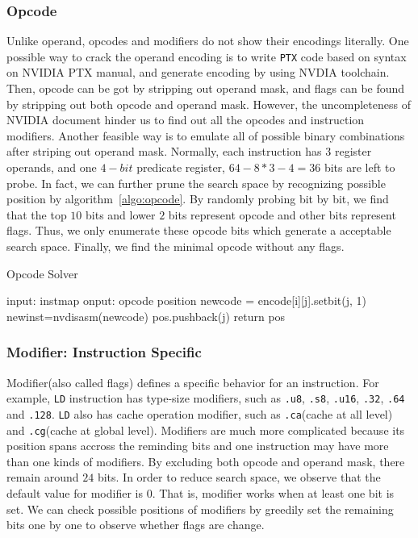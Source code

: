 \subsubsection{Opcode}
Unlike operand, opcodes and modifiers do not show their encodings literally. One possible way to crack the operand encoding is to write {\tt PTX} code
based on syntax on NVIDIA PTX manual, and generate encoding by using NVDIA toolchain.
Then, opcode can be got by stripping out operand mask, and flags can be found by stripping out both opcode and operand mask. However, the uncompleteness of NVIDIA document hinder us to find out all the opcodes and instruction modifiers. Another feasible way is to emulate all of possible binary combinations after striping out operand mask.
Normally, each instruction has $3$ register operands, and one $4-bit$ predicate register, $64-8*3-4=36$ bits are left to probe.
In fact, we can further prune the search space by recognizing possible position by algorithm~\ref{algo:opcode}. By randomly probing bit by bit, we find that the top $10$ bits and lower $2$ bits represent opcode and other bits represent flags. Thus, we only enumerate these opcode bits which generate a acceptable search space. Finally, we find the minimal opcode without any flags. 


\begin{algorithm}
      \caption{Opcode Solver}\label{algo:opcode}
  \begin{algorithmic}[1]
      \State input: instmap
      \State onput: opcode position
      \State newcode = encode[i][j].setbit(j, 1)
      \State newinst=nvdisasm(newcode)
      \State pos.pushback(j)
      \EndIf
      \EndIf
      \EndFor
      \EndFor
      \State return pos
  \end{algorithmic}
\end{algorithm}

\subsubsection{Modifier: Instruction Specific}

Modifier(also called flags) defines a specific behavior for an instruction. For example,
{\tt LD} instruction has type-size modifiers, such as {\tt .u8}, {\tt .s8}, {\tt .u16}, {\tt .32}, {\tt .64} and {\tt .128}. {\tt LD} also has cache operation modifier, such as {\tt .ca}(cache at all level) and {\tt .cg}(cache at global level). Modifiers are much more complicated because its position spans accross the reminding bits and one instruction may have more than one kinds of modifiers. By excluding both opcode and operand mask, there remain around $24$ bits. In order to reduce search space, we observe that the default value for modifier is $0$. That is, modifier works when at least one bit is set. We can check possible positions of modifiers by greedily set the remaining bits one by one to observe whether flags are change.


